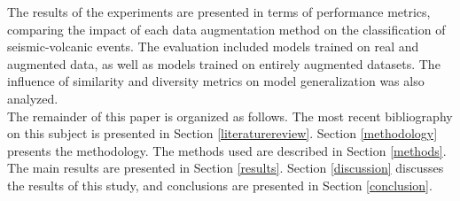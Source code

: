 \documentclass[lettersize,journal]{IEEEtran}
\begin{document}
The results of the experiments are presented in terms of performance metrics, comparing the impact of each data augmentation method on the classification of seismic-volcanic events. The evaluation included models trained on real and augmented data, as well as models trained on entirely augmented datasets. The influence of similarity and diversity metrics on model generalization was also analyzed.\\
The remainder of this paper is organized as follows. The most recent bibliography on this subject is presented in Section \ref{literaturereview}. Section \ref{methodology} presents the methodology. The methods used are described in Section \ref{methods}. The main results are presented in Section \ref{results}. Section \ref{discussion} discusses the results of this study, and conclusions are presented in Section \ref{conclusion}.
\end{document}
